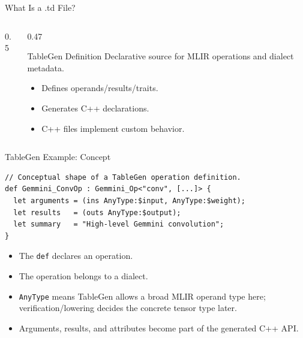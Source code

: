 \documentclass[aspectratio=169,10pt]{beamer}
\newcommand{\code}[1]{\texttt{\footnotesize #1}}
\begin{document}
\begin{frame}{What Is a .td File?}
  \begin{columns}
    \begin{column}{0.5\textwidth}
      \centering
    \end{column}
    \begin{column}{0.47\textwidth}
      \begin{block}{TableGen Definition}
        Declarative source for MLIR operations and dialect metadata.
      \end{block}
      \begin{itemize}
        \item Defines operands/results/traits.
        \item Generates C++ declarations.
        \item C++ files implement custom behavior.
      \end{itemize}
    \end{column}
  \end{columns}
\end{frame}

\begin{frame}[fragile]{TableGen Example: Concept}
  \begin{lstlisting}
// Conceptual shape of a TableGen operation definition.
def Gemmini_ConvOp : Gemmini_Op<"conv", [...]> {
  let arguments = (ins AnyType:$input, AnyType:$weight);
  let results   = (outs AnyType:$output);
  let summary   = "High-level Gemmini convolution";
}
  \end{lstlisting}
  \begin{itemize}
    \item The \code{def} declares an operation.
    \item The operation belongs to a dialect.
    \item \code{AnyType} means TableGen allows a broad MLIR operand type here; verification/lowering decides the concrete tensor type later.
    \item Arguments, results, and attributes become part of the generated C++ API.
  \end{itemize}
\end{frame}
\end{document}
